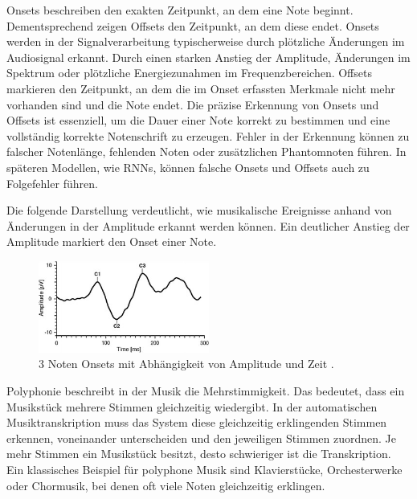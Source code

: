 \begin{description}[style=nextline]
\item[Onsets und Offsets]\label{itm:onset_offset}
Onsets beschreiben den exakten Zeitpunkt, an dem eine Note beginnt.
Dementsprechend zeigen Offsets den Zeitpunkt, an dem diese endet.
Onsets werden in der Signalverarbeitung typischerweise durch plötzliche Änderungen im Audiosignal erkannt.
Durch einen starken Anstieg der Amplitude, Änderungen im Spektrum oder plötzliche Energiezunahmen im Frequenzbereichen.
Offsets markieren den Zeitpunkt, an dem die im Onset erfassten Merkmale nicht mehr vorhanden sind und die Note endet.
Die präzise Erkennung von Onsets und Offsets ist essenziell,
um die Dauer einer Note korrekt zu bestimmen und eine vollständig korrekte Notenschrift zu erzeugen.
Fehler in der Erkennung können zu falscher Notenlänge, fehlenden Noten oder zusätzlichen Phantomnoten führen.
In späteren Modellen, wie RNNs, können falsche Onsets und Offsets auch zu Folgefehler führen.

Die folgende Darstellung verdeutlicht,
wie musikalische Ereignisse anhand von Änderungen in der Amplitude erkannt werden können.
Ein deutlicher Anstieg der Amplitude markiert den Onset einer Note.
\begin{figure}[H]
    \centering
    \includegraphics[width=0.5\textwidth]{Graphics/Onset_detection}
    \caption[Noten Onsets]{3 Noten Onsets mit Abhängigkeit von Amplitude und Zeit \cite{brown2016patternvep}.}
    \label{fig:onsets}
\end{figure}
\end{description}

\begin{description}[style=nextline]
\item[Polyphonie]\label{itm:polyphonie}
Polyphonie beschreibt in der Musik die Mehrstimmigkeit.
Das bedeutet, dass ein Musikstück mehrere Stimmen gleichzeitig wiedergibt.
In der automatischen Musiktranskription muss das System diese gleichzeitig erklingenden Stimmen erkennen, voneinander unterscheiden und den jeweiligen Stimmen zuordnen.
Je mehr Stimmen ein Musikstück besitzt, desto schwieriger ist die Transkription.
Ein klassisches Beispiel für polyphone Musik sind Klavierstücke, Orchesterwerke oder Chormusik, bei denen oft viele Noten gleichzeitig erklingen.
\end{description}

